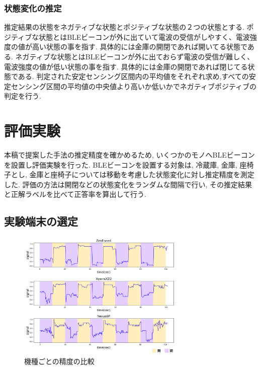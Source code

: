 \documentclass[Japanese]{dicomopapers}
\begin{document}
\subsubsection{状態変化の推定}
推定結果の状態をネガティブな状態とポジティブな状態の２つの状態とする.
ポジティブな状態とはBLEビーコンが外に出ていて電波の受信がしやすく、電波強度の値が高い状態の事を指す. 具体的には金庫の開閉であれば開いてる状態である.
ネガティブな状態とはBLEビーコンが外に出ておらず電波の受信が難しく、電波強度の値が低い状態の事を指す. 具体的には金庫の開閉であれば閉じてる状態である.
判定された安定センシング区間内の平均値をそれぞれ求め,すべての安定センシング区間の平均値の中央値より高いか低いかでネガティブポジティブの判定を行う.





\section{評価実験}

本稿で提案した手法の推定精度を確かめるため, いくつかのモノへBLEビーコンを設置し評価実験を行った.
BLEビーコンを設置する対象は, 冷蔵庫, 金庫, 座椅子とし, 金庫と座椅子については移動を考慮した状態変化に対し推定精度を測定した.
評価の方法は開閉などの状態変化をランダムな間隔で行い, その推定結果と正解ラベルを比べて正答率を算出して行う.

\subsection{実験端末の選定}

\begin{figure}[ht]
    \centering
    \includegraphics[width=8cm]{mix.png}
    \caption{機種ごとの精度の比較}
    \label{multi-data}
\end{figure}
\end{document}
